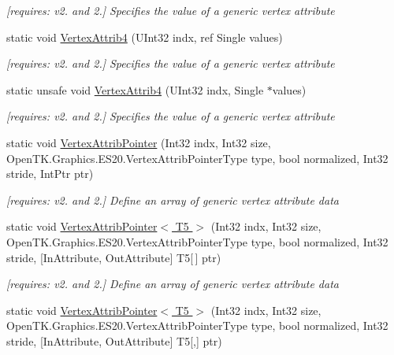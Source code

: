 \begin{DoxyCompactItemize}
\begin{DoxyCompactList}\small\item\em \mbox{[}requires\-: v2. and 2.\mbox{]} Specifies the value of a generic vertex attribute \end{DoxyCompactList}\item 
static void \hyperlink{class_open_t_k_1_1_graphics_1_1_e_s20_1_1_g_l_a7b71e9bb8266a649b6d913317a3f3282}{Vertex\-Attrib4} (U\-Int32 indx, ref Single values)
\begin{DoxyCompactList}\small\item\em \mbox{[}requires\-: v2. and 2.\mbox{]} Specifies the value of a generic vertex attribute \end{DoxyCompactList}\item 
static unsafe void \hyperlink{class_open_t_k_1_1_graphics_1_1_e_s20_1_1_g_l_aec2a6f5a77ce267cbde5e9b01978a85d}{Vertex\-Attrib4} (U\-Int32 indx, Single $\ast$values)
\begin{DoxyCompactList}\small\item\em \mbox{[}requires\-: v2. and 2.\mbox{]} Specifies the value of a generic vertex attribute \end{DoxyCompactList}\item 
static void \hyperlink{class_open_t_k_1_1_graphics_1_1_e_s20_1_1_g_l_ac7f5076b6e3684192508d22342ddd4e1}{Vertex\-Attrib\-Pointer} (Int32 indx, Int32 size, Open\-T\-K.\-Graphics.\-E\-S20.\-Vertex\-Attrib\-Pointer\-Type type, bool normalized, Int32 stride, Int\-Ptr ptr)
\begin{DoxyCompactList}\small\item\em \mbox{[}requires\-: v2. and 2.\mbox{]} Define an array of generic vertex attribute data \end{DoxyCompactList}\item 
static void \hyperlink{class_open_t_k_1_1_graphics_1_1_e_s20_1_1_g_l_a1db09b67bb09e8bbde444d856ef23af6}{Vertex\-Attrib\-Pointer$<$ T5 $>$} (Int32 indx, Int32 size, Open\-T\-K.\-Graphics.\-E\-S20.\-Vertex\-Attrib\-Pointer\-Type type, bool normalized, Int32 stride, \mbox{[}In\-Attribute, Out\-Attribute\mbox{]} T5\mbox{[}$\,$\mbox{]} ptr)
\begin{DoxyCompactList}\small\item\em \mbox{[}requires\-: v2. and 2.\mbox{]} Define an array of generic vertex attribute data \end{DoxyCompactList}\item 
static void \hyperlink{class_open_t_k_1_1_graphics_1_1_e_s20_1_1_g_l_ab0a29963ccf08126e726dfd90d65b761}{Vertex\-Attrib\-Pointer$<$ T5 $>$} (Int32 indx, Int32 size, Open\-T\-K.\-Graphics.\-E\-S20.\-Vertex\-Attrib\-Pointer\-Type type, bool normalized, Int32 stride, \mbox{[}In\-Attribute, Out\-Attribute\mbox{]} T5\mbox{[},\mbox{]} ptr)

\end{DoxyCompactItemize}

